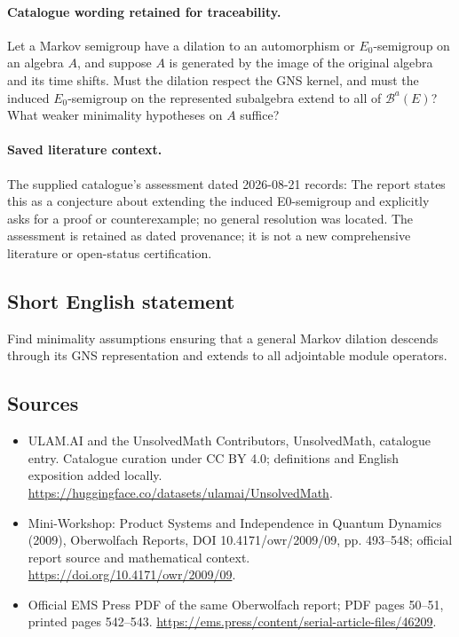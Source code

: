 \documentclass[11pt]{article}
\begin{document}
\paragraph{Catalogue wording retained for traceability.}
Let a Markov semigroup have a dilation to an automorphism or $E_0$-semigroup on an algebra $A$, and suppose $A$ is generated by the image of the original algebra and its time shifts. Must the dilation respect the GNS kernel, and must the induced $E_0$-semigroup on the represented subalgebra extend to all of $\mathcal B^a(E)$? What weaker minimality hypotheses on $A$ suffice?

\paragraph{Saved literature context.} The supplied catalogue's assessment dated 2026-08-21 records: The report states this as a conjecture about extending the induced E0-semigroup and explicitly asks for a proof or counterexample; no general resolution was located. The assessment is retained as dated provenance; it is not a new comprehensive literature or open-status certification.
\subsection{Short English statement}
Find minimality assumptions ensuring that a general Markov dilation descends through its GNS representation and extends to all adjointable module operators.
\subsection{Sources}
\begin{itemize}
\item[\hypertarget{source:statement:1}{S1}] ULAM.AI and the UnsolvedMath Contributors, UnsolvedMath, catalogue entry. Catalogue curation under CC BY 4.0; definitions and English exposition added locally.
\url{https://huggingface.co/datasets/ulamai/UnsolvedMath}.
\item[\hypertarget{source:statement:2}{S2}] Mini-Workshop: Product Systems and Independence in Quantum Dynamics (2009), Oberwolfach Reports, DOI 10.4171/owr/2009/09, pp. 493--548; official report source and mathematical context.
\url{https://doi.org/10.4171/owr/2009/09}.
\item[\hypertarget{source:statement:3}{S3}] Official EMS Press PDF of the same Oberwolfach report; PDF pages 50--51, printed pages 542--543.
\url{https://ems.press/content/serial-article-files/46209}.
\end{itemize}
\label{end:statement}
\end{document}
